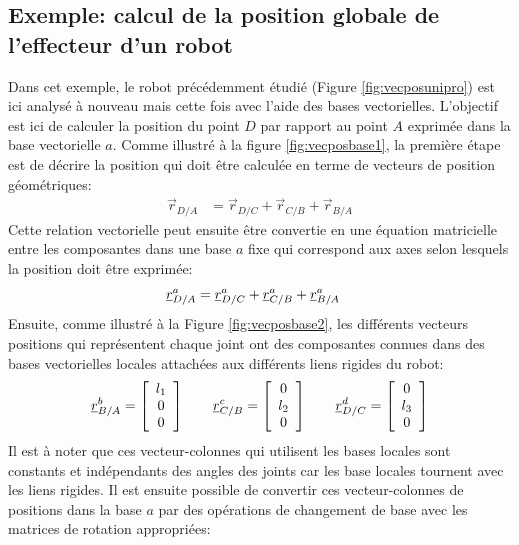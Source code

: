 \subsection{Exemple: calcul de la position globale de l'effecteur d'un robot}
\label{sec:exer-cinematique-base}
%
Dans cet exemple, le robot précédemment étudié (Figure \ref{fig:vecposunipro}) est ici analysé à nouveau mais cette fois avec l'aide des bases vectorielles. L'objectif est ici de calculer la position du point $D$ par rapport au point $A$ exprimée dans la base vectorielle $a$. Comme illustré à la figure \ref{fig:vecposbase1}, la première étape est de décrire la position qui doit être calculée en terme de vecteurs de position géométriques:
\begin{align}
\vec{r}_{D/A} &= \vec{r}_{D/C} + \vec{r}_{C/B} + \vec{r}_{B/A}
\end{align} 
Cette relation vectorielle peut ensuite être convertie en une équation matricielle entre les composantes dans une base $a$ fixe qui correspond aux axes selon lesquels la position doit être exprimée:
\begin{align}
\underline{r}_{D/A}^a &= \underline{r}_{D/C}^a + \underline{r}_{C/B}^a + \underline{r}_{B/A}^a
\label{eq:exaddbase}
\end{align} 
Ensuite, comme illustré à la Figure \ref{fig:vecposbase2}, les différents vecteurs positions qui représentent chaque joint ont des composantes connues dans des bases vectorielles locales attachées aux différents liens rigides du robot:
\begin{align}
\underline{r}_{B/A}^b = 
\left[ \begin{array}{c} 
l_1 \\ 0 \\ 0
\end{array} \right] 
\quad\quad
\underline{r}_{C/B}^c = 
\left[ \begin{array}{c} 
0 \\ l_2 \\ 0
\end{array} \right]
\quad\quad
\underline{r}_{D/C}^d = 
\left[ \begin{array}{c} 
0 \\ l_3 \\ 0
\end{array} \right] 
\end{align} 
Il est à noter que ces vecteur-colonnes qui utilisent les bases locales sont constants et indépendants des angles des joints car les base locales tournent avec les liens rigides. Il est ensuite possible de convertir ces vecteur-colonnes de positions dans la base $a$ par des opérations de changement de base avec les matrices de rotation appropriées:
